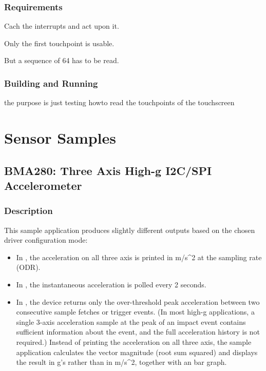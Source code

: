 \documentclass[letterpaper,10pt,english]{sphinxmanual}
\begin{document}
\subsubsection{Requirements}
\label{\detokenize{samples/basic/touchpoints/README:requirements}}
Cach the interrupts and act upon it.

Only the first touchpoint is usable.

But a sequence of 64 has to be read.


\subsubsection{Building and Running}
\label{\detokenize{samples/basic/touchpoints/README:building-and-running}}
the purpose is just testing howto read the touchpoints of the touchscreen


\section{Sensor Samples}
\label{\detokenize{samples/sensor/sensor:sensor-samples}}\label{\detokenize{samples/sensor/sensor:id1}}\label{\detokenize{samples/sensor/sensor::doc}}

\subsection{BMA280: Three Axis High-g I2C/SPI Accelerometer}
\label{\detokenize{samples/sensor/bma280/README:bma280-three-axis-high-g-i2c-spi-accelerometer}}\label{\detokenize{samples/sensor/bma280/README:bma280}}\label{\detokenize{samples/sensor/bma280/README::doc}}

\subsubsection{Description}
\label{\detokenize{samples/sensor/bma280/README:description}}
This sample application produces slightly different outputs based on the chosen
driver configuration mode:
\begin{itemize}
\item {} 
In ,
the acceleration on all three axis is printed in m/s\textasciicircum{}2 at the sampling rate (ODR).

\item {} 
In , the instantaneous acceleration is polled every 2 seconds.

\item {} 
In , the device returns only the over-threshold
peak acceleration between two consecutive sample fetches or trigger events.
(In most high-g applications, a single 3-axis acceleration sample at the peak
of an impact event contains sufficient information about the event, and the
full acceleration history is not required.) Instead of printing the acceleration
on all three axis, the sample application calculates the vector magnitude
(root sum squared) and displays the result in g’s rather than in m/s\textasciicircum{}2,
together with an bar graph.

\end{itemize}
\end{document}
